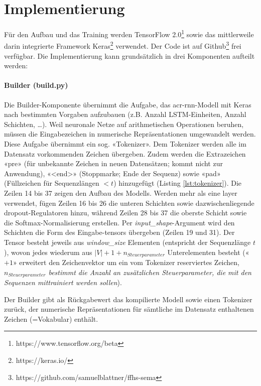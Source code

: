 \section{Implementierung}
\label{sec:model-implementation}

Für den Aufbau und das Training werden TensorFlow 2.0\footnote{https://www.tensorflow.org/beta} sowie das mittlerweile darin integrierte Framework Keras\footnote{https://keras.io/} verwendet.
Der Code ist auf Github\footnote{https://github.com/samuelblattner/ffhs-sema} frei verfügbar.
Die Implementierung kann grundsätzlich in drei Komponenten aufteilt werden:

\paragraph{Builder (build.py)} Die Builder-Komponente übernimmt die Aufgabe, das \acrshort{acr-rnn}-Modell mit Keras nach bestimmten Vorgaben aufzubauen (z.B. Anzahl LSTM-Einheiten, Anzahl Schichten, …).
Weil neuronale Netze auf arithmetischen Operationen beruhen, müssen die Eingabezeichen in numerische Repräsentationen umgewandelt werden.
Diese Aufgabe übernimmt ein sog. «\gls{Tokenizer}».
Dem Tokenizer werden alle im Datensatz vorkommenden Zeichen übergeben.
Zudem werden die Extrazeichen «pre» (für unbekannte Zeichen in neuen Datensätzen; kommt nicht zur Anwendung), «<end>» (Stoppmarke; Ende der Sequenz) sowie «pad» (Füllzeichen für Sequenzlängen $ < t $) hinzugefügt (Listing \ref{lst:tokenizer}).
Die Zeilen 14 bis 37 zeigen den Aufbau des Modells.
Werden mehr als eine \gls{layer} verwendet, fügen Zeilen 16 bis 26 die unteren Schichten sowie dazwischenliegende \gls{dropout}-Regulatoren hinzu, während Zeilen 28 bis 37 die oberste Schicht sowie die Softmax-Normalisierung erstellen.
Per \textit{input\_shape}-Argument wird den Schichten die Form des Eingabe-\gls{tensor}s übergeben (Zeilen 19 und 31).
Der Tensor besteht jeweils aus \textit{window\_size} Elementen (entspricht der Sequenzlänge $ t $), wovon jedes wiederum aus $ |V| + 1 + n_{Steuerparameter} $ Unterelementen besteht («$ + 1$» erweitert den Zeichenvektor um ein vom Tokenizer reserviertes Zeichen, \textit{$n_{Steuerparameter}$ bestimmt die Anzahl an zusätzlichen Steuerparameter, die mit den Sequenzen mittrainiert werden sollen}).

Der Builder gibt als Rückgabewert das kompilierte Modell sowie einen Tokenizer zurück, der numerische Repräsentationen für sämtliche im Datensatz enthaltenen Zeichen (=Vokabular) enthält.

